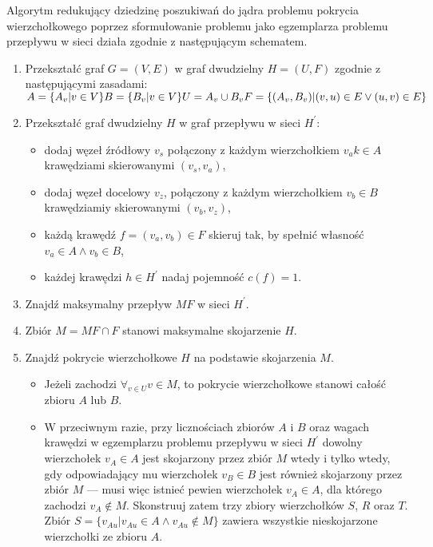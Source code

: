 Algorytm redukujący dziedzinę poszukiwań do jądra problemu pokrycia wierzchołkowego poprzez sformułowanie problemu jako egzemplarza problemu przepływu w sieci działa zgodnie z następującym schematem.
\begin{enumerate}
  \item Przekształć graf $G=(V,E)$ w graf dwudzielny $H=(U,F)$ zgodnie z
    następującymi zasadami:\\
    $A=\{A_v|v \in V\}\\
    B=\{B_v|v \in V\}\\
    U=A_v \cup B_v
    F=\{(A_v, B_v)|(v,u) \in E \lor (u,v) \in E\}$
  \item Przekształć graf dwudzielny $H$ w graf przepływu w sieci $H^\prime$:
    \begin{itemize}
      \item dodaj węzeł źródłowy $v_s$ połączony z każdym wierzchołkiem $v_a
        k\in A$ krawędziami skierowanymi $(v_s, v_a)$,
      \item dodaj węzeł docelowy $v_z$, połączony z każdym wierzchołkiem $v_b
        \in B$ krawędziamiy skierowanymi $(v_b, v_z)$,
      \item każdą krawędź $f=(v_a, v_b) \in F$ skieruj tak, by spełnić własność $v_a \in A \land v_b \in B$,
      \item każdej krawędzi $h \in H^\prime$ nadaj pojemność $c(f)=1$.
    \end{itemize}
  \item Znajdź maksymalny przepływ $MF$ w sieci $H^\prime$.
  \item Zbiór $M=MF \cap F$ stanowi maksymalne skojarzenie $H$.
  \item Znajdź pokrycie wierzchołkowe $H$ na podstawie skojarzenia $M$.
    \begin{itemize}
      \item Jeżeli zachodzi $\forall_{v \in U}{v \in M}$, to pokrycie wierzchołkowe stanowi całość zbioru $A$ lub $B$.
      \item W przeciwnym razie, przy licznościach zbiorów $A$ i $B$ oraz wagach krawędzi w egzemplarzu problemu przepływu w sieci $H^\prime$ dowolny wierzchołek $v_A \in A$ jest skojarzony przez zbiór $M$ wtedy i tylko wtedy, gdy odpowiadający mu wierzchołek $v_B \in B$ jest również skojarzony przez zbiór $M$ --- musi więc istnieć pewien wierzchołek $v_A \in A$, dla którego zachodzi $v_A \notin M$.
        Skonstruuj zatem trzy zbiory wierzchołków $S$, $R$ oraz $T$.
        Zbiór $S = \{v_{Au}|v_{Au} \in A \land v_{Au} \notin M\}$ zawiera wszystkie nieskojarzone wierzchołki ze zbioru $A$.

\end{itemize}
\end{enumerate}

